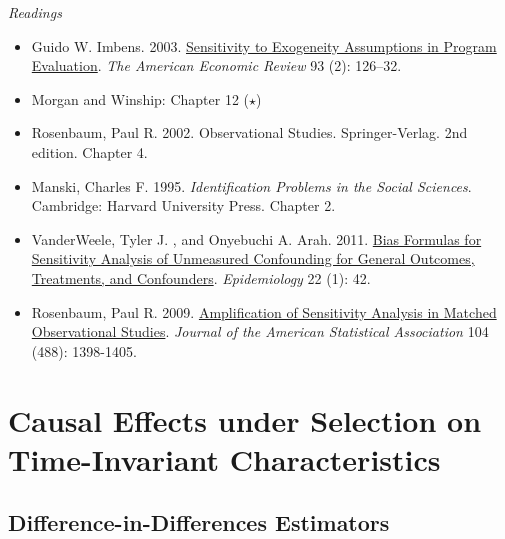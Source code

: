 \documentclass{article}
\begin{document}
\emph{Readings}
\begin{itemize}
\item Guido W. Imbens. 2003. \href{http://www.jstor.org/stable/3132212} {Sensitivity to Exogeneity Assumptions in Program Evaluation}. \textit{The American Economic Review} 93 (2): 126--32.
\item Morgan and Winship: Chapter 12 ($\star$)
\item Rosenbaum, Paul R. 2002. Observational Studies. Springer-Verlag. 2nd edition. Chapter 4.
\item Manski, Charles F. 1995. \textit{Identification Problems in the Social Sciences}. Cambridge: Harvard University Press. Chapter 2.
\item VanderWeele, Tyler J. , and Onyebuchi A. Arah. 2011. \href{http://journals.lww.com/epidem/Abstract/2011/01000/Bias_Formulas_for_Sensitivity_Analysis_of.8.aspx}{Bias Formulas for Sensitivity Analysis of Unmeasured Confounding for General Outcomes, Treatments, and Confounders}. \textit{Epidemiology} 22 (1): 42.
\item Rosenbaum, Paul R. 2009. \href{http://www.tandfonline.com/doi/abs/10.1198/jasa.2009.tm08470}{Amplification of Sensitivity Analysis in Matched Observational Studies}. \textit{Journal of the American Statistical Association} 104 (488): 1398-1405.
\end{itemize}


\section{Causal Effects under Selection on Time-Invariant Characteristics}

\subsection{Difference-in-Differences Estimators}
\end{document}
